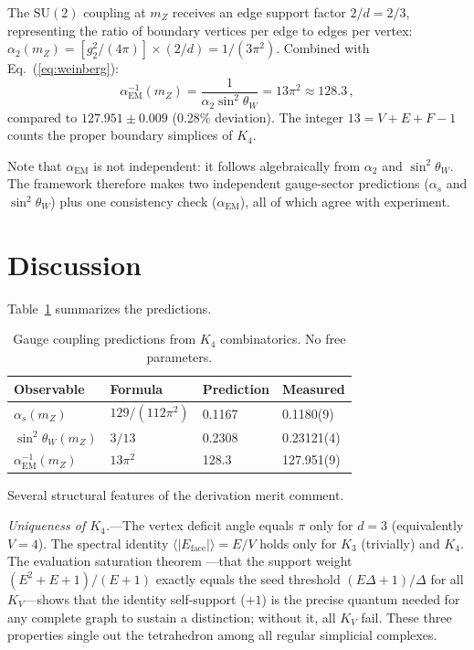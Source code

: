 \documentclass[aip,graphicx]{revtex4-1}
\begin{document}
The $\mathrm{SU}(2)$ coupling at $m_Z$ receives an edge support
factor $2/d = 2/3$, representing the ratio of boundary vertices per
edge to edges per vertex:
$\alpha_2(m_Z) = [g_2^2/(4\pi)] \times (2/d) = 1/(3\pi^2)$.
Combined with Eq.~(\ref{eq:weinberg}):
\begin{equation}
\boxed{\alpha_{\mathrm{EM}}^{-1}(m_Z)
= \frac{1}{\alpha_2 \sin^2\theta_W}
= 13\pi^2 \approx 128.3} \,,
\label{eq:alphaem}
\end{equation}
compared to $127.951 \pm 0.009$\cite{pdg2024} (0.28\% deviation).
The integer $13 = V + E + F - 1$ counts the proper boundary simplices
of $K_4$.

Note that $\alpha_{\mathrm{EM}}$ is not independent: it follows
algebraically from $\alpha_2$ and $\sin^2\theta_W$. The framework
therefore makes two independent gauge-sector predictions ($\alpha_s$
and $\sin^2\theta_W$) plus one consistency check
($\alpha_{\mathrm{EM}}$), all of which agree with experiment.


\section{Discussion}
\label{sec:discussion}

Table~\ref{tab:results} summarizes the predictions.

\begin{table}[h]
\caption{Gauge coupling predictions from $K_4$ combinatorics.
No free parameters.\label{tab:results}}
\begin{ruledtabular}
\begin{tabular}{llll}
Observable & Formula & Prediction & Measured \\
\hline
$\alpha_s(m_Z)$ & $129/(112\pi^2)$ & 0.1167 & 0.1180(9) \\
$\sin^2\theta_W(m_Z)$ & $3/13$ & 0.2308 & 0.23121(4) \\
$\alpha_{\mathrm{EM}}^{-1}(m_Z)$ & $13\pi^2$ & 128.3 & 127.951(9) \\
\end{tabular}
\end{ruledtabular}
\end{table}

Several structural features of the derivation merit comment.

\textit{Uniqueness of $K_4$.}---The vertex deficit angle equals
$\pi$ only for $d = 3$ (equivalently $V = 4$). The spectral
identity $\langle |E_{\mathrm{face}}| \rangle = E/V$ holds only
for $K_3$ (trivially) and $K_4$. The evaluation saturation theorem
---that the support weight $(E^2 + E + 1)/(E + 1)$ exactly equals
the seed threshold $(E\Delta + 1)/\Delta$ for all $K_V$---shows that
the identity self-support ($+1$) is the precise quantum needed for
any complete graph to sustain a distinction; without it, all $K_V$
fail. These three properties single out the tetrahedron among all
regular simplicial complexes.
\end{document}

